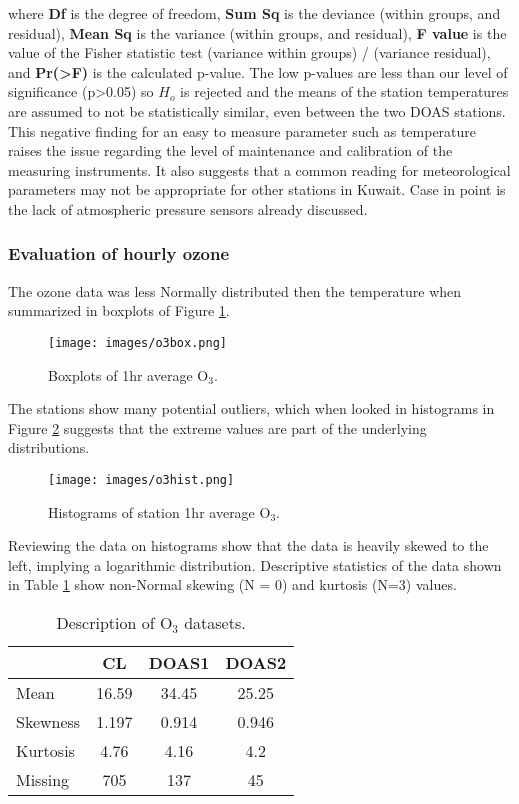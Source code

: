 \noindent
where \textbf{Df}  is the degree of freedom, \textbf{Sum Sq} is the deviance (within groups, and residual), \textbf{Mean Sq} is the  variance (within groups, and residual), \textbf{F value} is  the value of the Fisher statistic test (variance within groups) / (variance residual), and \textbf{Pr(>F)} is the calculated p-value. The low p-values are less than our level of significance (p>0.05) so  $H_{o}$ is rejected and the means of the station temperatures are assumed to not be statistically similar, even between the two DOAS stations. This negative finding for an easy to measure parameter such as temperature raises the issue regarding the level of maintenance and calibration of the measuring instruments. It also suggests that a common reading for meteorological parameters may not be appropriate for other stations in Kuwait. Case in point is the lack of atmospheric pressure sensors already discussed.  

\subsubsection{Evaluation of hourly ozone}
The ozone data was less Normally distributed then the temperature when summarized in boxplots of Figure \ref{fig:o3box}.
%
\begin{figure}[H]
\centering
\texttt{[image: images/o3box.png]} 
\caption{Boxplots of 1hr average O$_{3}$.}
\label{fig:o3box}
\end{figure}
%
The stations show many potential outliers, which when looked in histograms in Figure \ref{fig:o3hist} suggests that the extreme values are part of the underlying distributions.

%
\begin{figure}[H]
\centering
\texttt{[image: images/o3hist.png]} 
\caption{Histograms of station 1hr average O$_{3}$.}
\label{fig:o3hist}
\end{figure}
%

Reviewing the data on histograms show that the data is heavily skewed to the left, implying a logarithmic distribution. Descriptive statistics of the data shown in Table \ref{tab:o3sets} show non-Normal skewing (N = 0) and kurtosis (N=3) values.
%
\begin{table}[H]
\centering
\caption{Description of O$_{3}$ datasets.}
\label{tab:o3sets}
\begin{tabular}{@{}lccc@{}}
\toprule
 & \textbf{CL} & \textbf{DOAS1} & \textbf{DOAS2} \\ \midrule
Mean & 16.59 & 34.45 & 25.25 \\
Skewness & 1.197 & 0.914 & 0.946 \\
Kurtosis & 4.76 & 4.16 & 4.2 \\
Missing & 705 & 137 & 45 \\ \bottomrule
\end{tabular}
\end{table}
%


